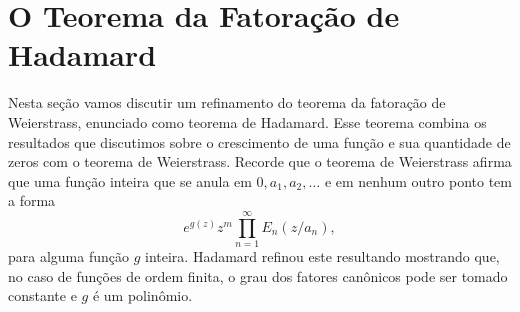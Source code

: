     \section{O Teorema da Fatoração de Hadamard}
    Nesta seção vamos discutir um refinamento do teorema da fatoração de Weierstrass,
    enunciado como teorema de Hadamard. Esse teorema combina os resultados que discutimos
    sobre o crescimento de uma função e sua quantidade de zeros com o teorema de
    Weierstrass. Recorde que o teorema de Weierstrass afirma que uma função inteira
    que se anula em $0, a_1, a_2, \dots$ e em nenhum outro ponto tem a forma
    \[
        e^{g(z)}z^m\prod_{n=1}^{\infty} E_n(z/a_n),
    \]
    para alguma função $g$ inteira.
    Hadamard refinou este resultando mostrando que, no caso de funções de ordem finita,
    o grau dos fatores canônicos pode ser tomado constante e $g$ é um polinômio.
    
